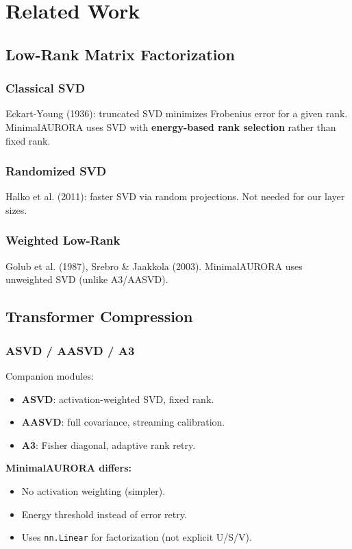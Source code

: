 \section{Related Work}

\subsection{Low-Rank Matrix Factorization}

\subsubsection{Classical SVD}

Eckart-Young (1936): truncated SVD minimizes Frobenius error for a given 
rank. MinimalAURORA uses SVD with \textbf{energy-based rank selection} rather 
than fixed rank.

\subsubsection{Randomized SVD}

Halko et al. (2011): faster SVD via random projections. Not needed for 
our layer sizes.

\subsubsection{Weighted Low-Rank}

Golub et al. (1987), Srebro \& Jaakkola (2003). MinimalAURORA uses 
unweighted SVD (unlike A3/AASVD).

\subsection{Transformer Compression}

\subsubsection{ASVD / AASVD / A3}

Companion modules:
\begin{itemize}
\item \textbf{ASVD}: activation-weighted SVD, fixed rank.
\item \textbf{AASVD}: full covariance, streaming calibration.
\item \textbf{A3}: Fisher diagonal, adaptive rank retry.

\end{itemize}
\textbf{MinimalAURORA differs:}
\begin{itemize}
\item No activation weighting (simpler).
\item Energy threshold instead of error retry.
\item Uses \texttt{nn.Linear} for factorization (not explicit U/S/V).

\end{itemize}
